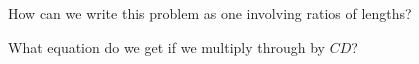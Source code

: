 How can we write this problem as one involving ratios of lengths?


What equation do we get if we multiply through by $CD$?




















